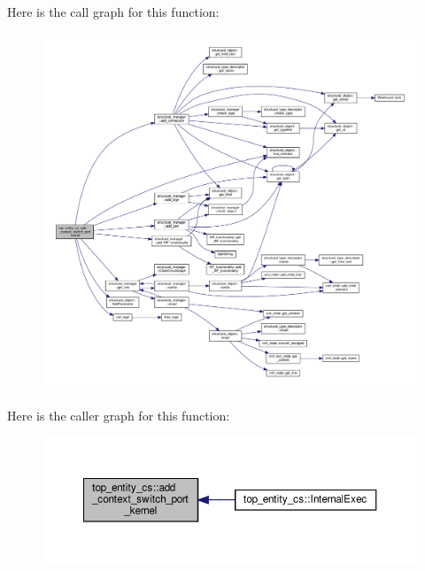 Here is the call graph for this function\+:
\nopagebreak
\begin{figure}[H]
\begin{center}
\leavevmode
\includegraphics[width=350pt]{d5/d78/classtop__entity__cs_a19522f640bbc667757f9ad40166e879f_cgraph}
\end{center}
\end{figure}
Here is the caller graph for this function\+:
\nopagebreak
\begin{figure}[H]
\begin{center}
\leavevmode
\includegraphics[width=350pt]{d5/d78/classtop__entity__cs_a19522f640bbc667757f9ad40166e879f_icgraph}
\end{center}
\end{figure}
\mbox{\label{classtop__entity__cs_a290fda5dd0c19322fd858606b5706aec}} 
